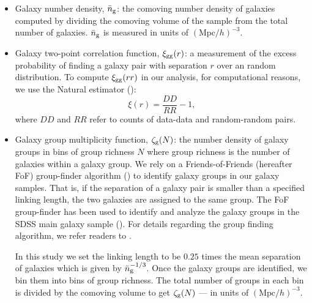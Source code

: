 \documentclass[fleqn,usenatbib]{mnras}
\newcommand{\beq}{\begin{equation}}
\newcommand{\eeq}{\end{equation}}
\begin{document}
\begin{itemize}
\item Galaxy number density, $\bar{n}_{\mathrm{g}}$: the comoving number density of galaxies computed  
by dividing the comoving volume of the sample from the total number of galaxies. $\bar{n}_{\mathrm{g}}$ is 
measured in units of $(\mathrm{Mpc}/h)^{-3}$.  

\item Galaxy two-point correlation function, $\xi_{\mathrm{gg}}(r)$: a measurement of the excess probability 
of finding a galaxy pair with separation $r$ over an random distribution. To compute $\xi_{\mathrm{gg}}(rr)$
in our analysis, for computational reasons, we use the Natural estimator (\citealt{peebles80}): 
\beq
\xi(r) = \frac{DD}{RR} - 1, 
\eeq
where $DD$ and $RR$ refer to counts of data-data and random-random pairs.  

\item Galaxy group multiplicity function, $\mathcal{\zeta}_{\rm g}(N)$: the number density of galaxy groups in bins 
of group richness $N$ where group richness is the number of galaxies within a galaxy group. We 
rely on a Friends-of-Friends (hereafter FoF) group-finder algorithm (\citealt{fof}) to identify 
galaxy groups in our galaxy samples. That is, if the separation of a galaxy pair is smaller than a 
specified linking length, the two galaxies are assigned to the same group. The FoF group-finder 
has been used to identify and analyze the galaxy groups in the SDSS main galaxy sample (\cite{groups}). 
For details regarding the group finding algorithm, we refer readers to \cite{fof}. 

In this study we set the linking length to be $0.25$ times the mean separation of galaxies which 
is given by $\bar{n}_{\mathrm{g}}^{-1/3}$. Once the galaxy groups are identified, we bin them into bins of 
group richness. The total number of groups in each bin is divided by the comoving volume to get 
$\mathcal{\zeta}_{\rm g}(N)$ --- in units of $(\mathrm{Mpc}/h)^{-3}$. 
\end{itemize}
\end{document}
